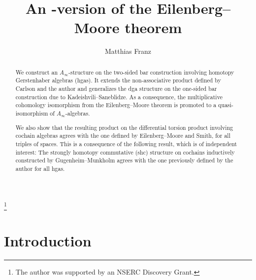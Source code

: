\documentclass[letterpaper]{amsart}
\numberwithin{equation}{section}
\theoremstyle{plain}
\theoremstyle{definition}
\theoremstyle{remark}
\def\Ainf{A_{\infty}}
\begin{document}
\title[An \texorpdfstring{$\Ainf$}{A∞}-version of the Eilenberg--Moore theorem]{An \boldmath{$\Ainf$}-version of the Eilenberg--Moore theorem}
\author{Matthias Franz}
\thanks{The author was supported by an NSERC Discovery Grant.}
\address{Department of Mathematics, University of Western Ontario,
  London, Ont.\ N6A\;5B7, Canada}


\begin{abstract}
  We construct an $\Ainf$-structure on the two-sided bar construction
  involving homotopy Gerstenhaber algebras (hgas).
  It extends the non-associative product defined by Carlson and the author
  and generalizes the dga structure on the one-sided bar construction due to Kadeishvili--Saneblidze.
  As a consequence, the multiplicative cohomology isomorphism
  from the Eilenberg--Moore theorem is promoted to a quasi-iso\-mor\-phism of $\Ainf$-algebras.

  We also show that the resulting product on the differential torsion product involving cochain algebras
  agrees with the one defined by Eilenberg--Moore and Smith, for all triples of spaces.
  This is a consequence of the following result, which is of independent interest:
  The strongly homotopy commutative (shc) structure on cochains inductively constructed by Gugenheim--Munkholm
  agrees with the one previously defined by the author for all hgas.
\end{abstract}

\maketitle



\section{Introduction}
\end{document}
